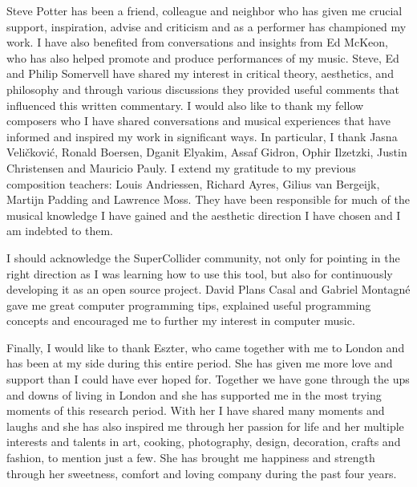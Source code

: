 Steve Potter has been a friend, colleague and neighbor who has given me crucial support, inspiration, advise and criticism and as a performer has championed my work. I have also benefited from conversations and insights from Ed McKeon, who has also helped promote and produce performances of my music. Steve, Ed and Philip Somervell have shared my interest in critical theory, aesthetics, and philosophy and through various discussions they provided useful comments that influenced this written commentary. I would also like to thank my fellow composers who I have shared conversations and musical experiences that have informed and inspired my work in significant ways. In particular, I thank Jasna Veli\v{c}kovi\'{c}, Ronald Boersen, Dganit Elyakim, Assaf Gidron, Ophir Ilzetzki, Justin Christensen and Mauricio Pauly. I extend my gratitude to my previous composition teachers: Louis Andriessen, Richard Ayres, Gilius van Bergeijk, Martijn Padding and Lawrence Moss. They have been responsible for much of the musical knowledge I have gained and the aesthetic direction I have chosen and I am indebted to them.

I should acknowledge the SuperCollider community, not only for pointing in the right direction as I was learning how to use this tool, but also for continuously developing it as an open source project. David Plans Casal and Gabriel Montagn\'e gave me great computer programming tips, explained useful programming concepts and encouraged me to further my interest in computer music.

Finally, I would like to thank Eszter, who came together with me to London and has been at my side during this entire period. She has given me more love and support than I could have ever hoped for. Together we have gone through the ups and downs of living in London and she has supported me in the most trying moments of this research period. With her I have shared many moments and laughs and she has also inspired me through her passion for life and her multiple interests and talents in art, cooking, photography, design, decoration, crafts and fashion, to mention just a few. She has brought me happiness and strength through her sweetness, comfort and loving company during the past four years.  
